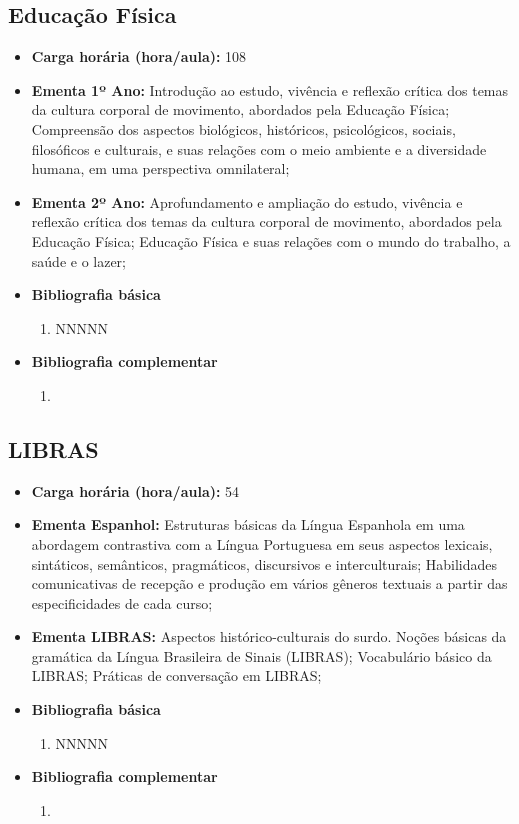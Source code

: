 \documentclass[11pt,fleqn]{book} %
\begin{document}
\newpage
\subsection{Educação Física}\label{disc:educacaofisica}
\begin{itemize}
	\item \textbf{Carga horária (hora/aula):} 108
	\item \textbf{Ementa 1º Ano:} 
	Introdução ao estudo, vivência e reflexão crítica dos temas da cultura corporal de movimento, abordados pela Educação Física;
	Compreensão dos aspectos biológicos, históricos, psicológicos, sociais, filosóficos e culturais, e suas relações com o meio ambiente e a diversidade humana, em uma perspectiva omnilateral;
	
	\item \textbf{Ementa 2º Ano:} 
	Aprofundamento e ampliação do estudo, vivência e reflexão crítica dos temas da cultura corporal de movimento, abordados pela Educação Física;
	Educação Física e suas relações com o mundo do trabalho, a saúde e o lazer;	
	\item \textbf{Bibliografia básica}
	\begin{enumerate}
		\item NNNNN
	\end{enumerate}
	\item \textbf{Bibliografia complementar}
	\begin{enumerate}
		\item 
	\end{enumerate}	
\end{itemize}

\newpage
\subsection{LIBRAS}\label{disc:libras}
\begin{itemize}
	\item \textbf{Carga horária (hora/aula):} 54
	\item \textbf{Ementa Espanhol:} 
	Estruturas básicas da Língua Espanhola em uma abordagem contrastiva com a Língua Portuguesa em seus aspectos lexicais, sintáticos, semânticos, pragmáticos, discursivos e interculturais; 
	Habilidades comunicativas de recepção e produção em vários gêneros textuais a partir das especificidades de cada curso;
	\item \textbf{Ementa LIBRAS:}
	Aspectos histórico-culturais do surdo. Noções básicas da gramática da Língua Brasileira de Sinais (LIBRAS);
	Vocabulário básico da LIBRAS;
	Práticas de conversação em LIBRAS;		
	\item \textbf{Bibliografia básica}
	\begin{enumerate}
		\item NNNNN
	\end{enumerate}
	\item \textbf{Bibliografia complementar}
	\begin{enumerate}
		\item 
	\end{enumerate}	
\end{itemize}
\end{document}
